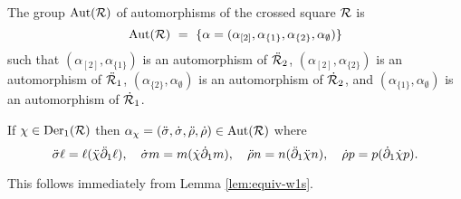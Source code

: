 \begin{defn}
The group $\mathrm{Aut}(\mathcal{R})$ of automorphisms of the crossed square $\mathcal{R}$ is 
$$
\mathrm{Aut}(\mathcal{R}) ~=~ \{ \alpha = 
(\alpha_{[2]}, \alpha_{\{1\}}, \alpha_{\{2\}}, \alpha_{\emptyset}) \}
$$ 
such that 
$(\alpha_{[2]}, \alpha_{\{1\}}) $  is an automorphism of  $\ddot{\mathcal{R}}_2$,
$(\alpha_{[2]}, \alpha_{\{2\}}) $  is an automorphism of  $\ddot{\mathcal{R}}_1$,
$(\alpha_{\{2\}}, \alpha_{\emptyset}) $  is an automorphism of  $\dot{\mathcal{R}}_2$, and 
$(\alpha_{\{1\}}, \alpha_{\emptyset}) $  is an automorphism of  $\dot{\mathcal{R}}_1$.
\end{defn}

\begin{lem} \label{lem:alpha-chi}
If $\chi \in \mathrm{Der}_1(\mathcal{R})$ then
$\alpha_{\chi} = (\ddot{\sigma},\dot{\sigma},\ddot{\rho},\dot{\rho}) \in \mathrm{Aut}(\mathcal{R})$
where
$$
\ddot{\sigma} \ell = \ell(\ddot{\chi} \ddot{\partial}_1 \ell), \quad
\dot{\sigma} m = m(\dot{\chi} \dot{\partial}_1 m), \quad
\ddot{\rho} n = n(\ddot{\partial}_1 \ddot{\chi}  n), \quad
\dot{\rho} p = p(\dot{\partial}_1 \dot{\chi} p). 
$$
\end{lem}
\begin{pf}
This follows immediately from Lemma \ref{lem:equiv-w1s}.
\end{pf}

